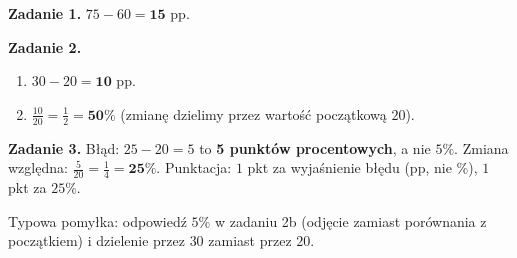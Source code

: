 \documentclass[11pt,a4paper]{article}
\begin{document}

\vspace{0.6em}
\textbf{Zadanie 1.} $75-60=\mathbf{15}$ pp.

\textbf{Zadanie 2.}
\begin{enumerate}[label=\alph*), leftmargin=*, itemsep=4pt]
  \item $30-20=\mathbf{10}$ pp.
  \item $\frac{10}{20}=\frac{1}{2}=\mathbf{50\%}$ (zmianę dzielimy przez wartość początkową $20$).
\end{enumerate}

\textbf{Zadanie 3.} Błąd: $25-20=5$ to \textbf{5 punktów procentowych}, a nie $5\%$. Zmiana względna: $\frac{5}{20}=\frac{1}{4}=\mathbf{25\%}$. Punktacja: $1$ pkt za wyjaśnienie błędu (pp, nie \%), $1$ pkt za $25\%$.

\vspace{0.6em}
\begin{tcolorbox}[colback=white, colframe=okres, boxrule=0.6pt, arc=2pt, title=Wskazówka dla Pawła]
Typowa pomyłka: odpowiedź $5\%$ w zadaniu 2b (odjęcie zamiast porównania z początkiem) i dzielenie przez $30$ zamiast przez $20$.
\end{tcolorbox}
\end{document}
